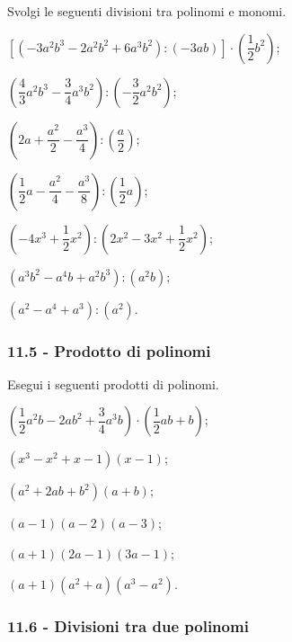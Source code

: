 \begin{esercizio}
\label{ese:11.22} %
 Svolgi le seguenti divisioni tra polinomi e monomi.

\begin{enumeratea}
 \item $\left[\left(-3a^{2}b^{3}-2a^{2}b^{2}+6a^{3}b^{2}\right):(-3{ab})\right]\cdot\left(\dfrac{1}{2}b^{2}\right)$;
 \item $\left(\dfrac{4}{3}a^{2}b^{3}-\dfrac{3}{4}a^{3}b^{2}\right):\left(-{\dfrac{3}{2}a^{2}b^{2}}\right)$;
 \item $\left(2a+\dfrac{a^{2}}{2}-\dfrac{a^{3}}{4}\right):\left(\dfrac{a}{2}\right)$;
 \item $\left(\dfrac{1}{2}a-\dfrac{a^{2}}{4}-\dfrac{a^{3}}{8}\right):\left(\dfrac{1}{2}a\right)$;
 \item $\left(-4x^{3}+\dfrac{1}{2}x^{2}\right):\left(2x^{2}-3x^{2}+\dfrac{1}{2}x^{2}\right)$;
 \item $\left(a^{3}b^{2}-a^{4}b+a^{2}b^{3}\right):\left(a^{2}b\right)$;
 \item $\left(a^{2}-a^{4}+a^{3}\right):\left(a^{2}\right)$.
\end{enumeratea}
\end{esercizio}

\subsubsection*{11.5 - Prodotto di polinomi}
\begin{esercizio}
\label{ese:11.23} %
Esegui i seguenti prodotti di polinomi.
\begin{multicols}{2}
\begin{enumeratea}
 \item $\left(\dfrac{1}{2}a^{2}b-2{ab}^{2}+\dfrac{3}{4}a^{3}b\right)\cdot\left(\dfrac{1}{2}{ab}+b\right)$;
 \item $\left(x^{3}-x^{2}+x-1\right)({x}-1)$;
 \item $\left(a^{2}+2{ab}+b^{2}\right)(a+b)$;
 \item $(a-1)(a-2)(a-3)$;
 \item $(a+1)(2a-1)(3a-1)$;
 \item $(a+1)\left(a^{2}+a\right)\left(a^{3}-a^{2}\right)$.
\end{enumeratea}
\end{multicols}
\end{esercizio}

\subsubsection*{11.6 - Divisioni tra due polinomi}

